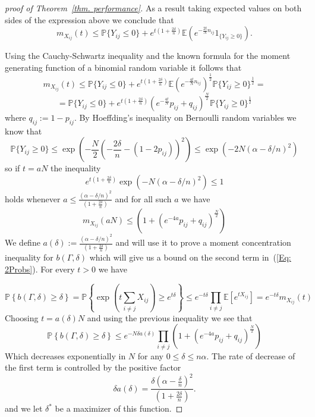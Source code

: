 \documentclass[12pt]{amsart}
\theoremstyle{remark}
\newcommand{\PP}{\mathbb{P}}
\newcommand{\EE}{\mathbb{E}}
\begin{document}
\begin{proof} [proof of Theorem~\ref{thm. performance}]
As a result taking expected values on both sides of the expression above we conclude that
\[ m_{X_{ij}}(t) \leq \PP\{Y_{ij}\leq 0\} + e^{t\left(1+\frac{2\delta}{n}\right)}\EE\left(e^{-\frac{2t}{N}n_{ij}}1_{\{Y_{ij}\geq 0\}}\right).\]

Using the Cauchy-Schwartz inequality and the known formula for the moment generating function of a binomial random variable it follows that
\[ m_{X_{ij}}(t)\leq \PP\{Y_{ij}\leq 0\}+ e^{t\left(1+\frac{2\delta}{n}\right)}\EE\left(e^{-\frac{4t}{N}n_{ij}}\right)^{\frac{1}{2}}\PP\{Y_{ij}\geq 0\}^{\frac{1}{2}}=\]
\[=\PP\{Y_{ij}\leq 0\}+ e^{t\left(1+\frac{2\delta}{n}\right)}\left(e^{-\frac{4t}{N}}p_{ij} + q_{ij}\right)^{\frac{N}{2}}\PP\{Y_{ij}\geq 0\}^{\frac{1}{2}}\]
where $q_{ij}:=1-p_{ij}$.
By Hoeffding's inequality on Bernoulli random variables we know that
\[\PP\{Y_{ij}\geq 0\}\leq \exp\left(-\frac{N}{2}\left(-\frac{2\delta}{n}-(1-2p_{ij})\right)^2 \right)\leq \exp\left(-2N(\alpha-\delta/n)^2\right)\]
so if $t=aN$ the inequality 
\[e^{t\left(1+\frac{2\delta}{n}\right)}\exp\left(-N(\alpha-\delta/n)^2\right)\leq 1\] 
holds whenever $a\leq \frac{(\alpha-\delta/n)^2}{\left(1+\frac{2\delta}{n}\right)}$ and for all such $a$ we have
\[m_{X_{ij}}(aN)\leq \left(1+ (e^{-4a}p_{ij}+q_{ij})^{\frac{N}{2}}\right)\]
We define $a(\delta):=\frac{(\alpha-\delta/n)^2}{\left(1+\frac{2\delta}{n}\right)}$ and will use it to prove a moment concentration inequality for $b(\Gamma,\delta)$ which will give us a bound on the second term in~(\ref{Eq: 2Probs}). For every $t>0$ we have

\[\PP\left\{b(\Gamma,\delta)\geq \delta\right\}=\PP\left\{\exp\left(t\sum_{i\neq j} X_{ij}\right)\geq e^{t\delta}\right\}\leq e^{-t\delta}\prod_{i\neq j} \EE[e^{tX_{ij}}]= e^{-t\delta}m_{X_{ij}}(t)\]
Choosing $t=a(\delta)N$ and using the previous inequality we see that
\[\PP\left\{b(\Gamma,\delta)\geq \delta\right\}\leq e^{-N\delta a(\delta)}\prod_{i\neq j}\left(1+ (e^{-4a}p_{ij}+q_{ij})^{\frac{N}{2}}\right)\]
Which decreases exponentially in $N$ for any $0\leq \delta\leq n\alpha$. The rate of decrease of the first term is controlled by the positive factor 
\[\delta a(\delta)= \frac{\delta\left(\alpha-\frac{\delta}{n}\right)^2}{\left(1+\frac{2\delta}{n}\right)}.\]
and we let $\delta^*$ be a maximizer of this function.
\end{proof}
\end{document}

